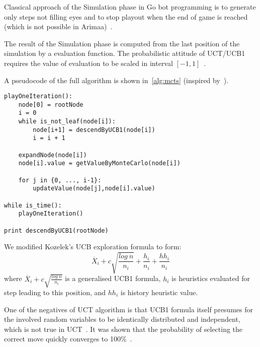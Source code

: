Classical approach of the Simulation phase in Go bot programming is to generate
only steps not filling eyes and to stop playout when the end of game is
reached (which is not possible in Arimaa)~\cite{MoGo}.

The result of the Simulation phase is computed from the last position of the
simulation by a evaluation function. The probabilistic attitude of UCT/UCB1
requires the value of evaluation to be scaled in interval
$[-1,1]$~\cite{KOZELEK}.

A pseudocode of the full algorithm is shown in~\ref{alg:mcts} (inspired
by~\cite{MoGo}).

\lstset{language=Python, caption=Pseudocode of the MonteCarlo Tree Search, label=alg:mcts}
\begin{lstlisting}
playOneIteration():
    node[0] = rootNode
    i = 0
    while is_not_leaf(node[i]):
        node[i+1] = descendByUCB1(node[i])
        i = i + 1

    expandNode(node[i])
    node[i].value = getValueByMonteCarlo(node[i])

    for j in {0, ..., i-1}:
        updateValue(node[j],node[i].value)

while is_time():
    playOneIteration()

print descendByUCB1(rootNode)
\end{lstlisting}

We modified Kozelek's UCB exploration formula to form:
	$$
	\overline X_i + c \sqrt{\frac{log~n}{n_i}} + \frac{h_i}{n_i} + \frac{hh_i}{n_i}
	$$
where $\overline X_i + c \sqrt{\frac{log~n}{n_i}}$ is a generalised UCB1
formula, $h_i$ is heuristics evaluated for step leading to this position, and
$hh_i$ is history heuristic value.

One of the negatives of UCT algorithm is that UCB1 formula itself presumes for
the involved random variables to be identically distributed and independent,
which is not true in UCT~\cite{MoGo}. It was shown that the probability of
selecting the correct move quickly converges to 100\%~\cite{UCTanalysis}.

